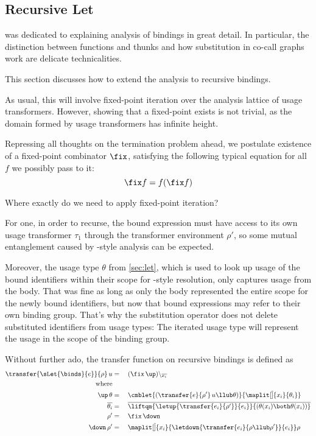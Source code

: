 \subsection{Recursive Let}\label{sec:letrec}

 was dedicated to explaining analysis of  bindings in great detail. 
In particular, the distinction between functions and thunks and how substitution in co-call graphs work are delicate technicalities.

This section discusses how to extend the analysis to recursive  bindings.

As usual, this will involve fixed-point iteration over the analysis lattice of usage transformers.
However, showing that a fixed-point exists is not trivial, as the domain formed by usage transformers has infinite height.

Repressing all thoughts on the termination problem ahead, we postulate existence of a fixed-point combinator $\fix$, satisfying the following typical equation for all $f$ we possibly pass to it:
\[
  \fix f = f (\fix f)
\]

Where exactly do we need to apply fixed-point iteration? 

For one, in order to recurse, the bound expression must have access to its own usage transformer $\tau_1$ through the transformer environment $\rho'$, so some mutual entanglement caused by -style analysis can be expected. 

Moreover, the usage type $\theta$ from \cref{sec:let}, which is used to look up usage of the bound identifiers within their scope for -style resolution, only captures usage from the body. 
That was fine as long as only the body represented the entire scope for the newly bound identifiers, but now that bound expressions may refer to their own binding group. 
That's why the substitution operator does not delete substituted identifiers from usage types:
The iterated usage type will represent the usage in the scope of the binding group.

Without further ado, the transfer function on recursive bindings is defined as
\begin{alignat*}{2}
  \transfer{\sLet{\binds}{e}}{\rho}\,u &{}={}&& (\fix\,\up) \setminus_{\overline{x_i}} \\
  \text{where} \\
   \up\,\theta &{}={}&& \cmblet{(\transfer{e}{\rho'}\,u \llub \theta)}{\maplit[\overline]{x_i}{\theta_i}} \\
   \overline{\theta_i} &{}={}&& \overline{\liftqm{\letup{\transfer{e_i}{\rho'}}{e_i}}{(\theta(x_i) \both \theta(x_i))}} \\
   \rho' &{}={}&& \fix\,\down \\
   \down\,\rho' &{}={}&& \maplit[\overline]{x_i}{\letdown{\transfer{e_i}{\rho \llub \rho'}}{e_i}}\rho \\ 
\end{alignat*}

